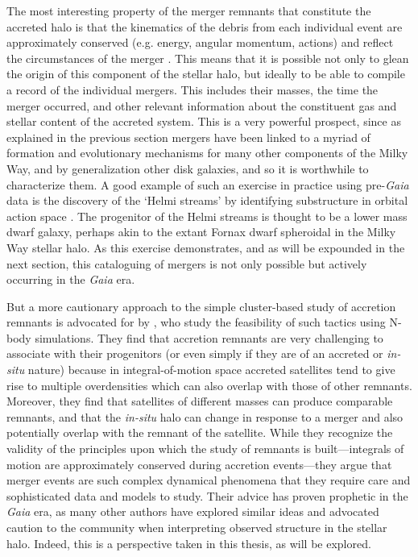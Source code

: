 The most interesting property of the merger remnants that constitute the accreted halo is that the kinematics of the debris from each individual event are approximately conserved (e.g. energy, angular momentum, actions) and reflect the circumstances of the merger \parencite{helmi00,johnston08}. This means that it is possible not only to glean the origin of this component of the stellar halo, but ideally to be able to compile a record of the individual mergers. This includes their masses, the time the merger occurred, and other relevant information about the constituent gas and stellar content of the accreted system. This is a very powerful prospect, since as explained in the previous section mergers have been linked to a myriad of formation and evolutionary mechanisms for many other components of the Milky Way, and by generalization other disk galaxies, and so it is worthwhile to characterize them. A good example of such an exercise in practice using pre-\textit{Gaia} data is the discovery of the `Helmi streams' by identifying substructure in orbital action space \parencite{helmi99}. The progenitor of the Helmi streams is thought to be a lower mass dwarf galaxy, perhaps akin to the extant Fornax dwarf spheroidal in the Milky Way stellar halo. As this exercise demonstrates, and as will be expounded in the next section, this cataloguing of mergers is not only possible but actively occurring in the \textit{Gaia} era.

But a more cautionary approach to the simple cluster-based study of accretion remnants is advocated for by \textcite{jean-baptiste17}, who study the feasibility of such tactics using N-body simulations. They find that accretion remnants are very challenging to associate with their progenitors (or even simply if they are of an accreted or \textit{in-situ} nature) because in integral-of-motion space accreted satellites tend to give rise to multiple overdensities which can also overlap with those of other remnants. Moreover, they find that satellites of different masses can produce comparable remnants, and that the \textit{in-situ} halo can change in response to a merger and also potentially overlap with the remnant of the satellite. While they recognize the validity of the principles upon which the study of remnants is built---integrals of motion are approximately conserved during accretion events---they argue that merger events are such complex dynamical phenomena that they require care and sophisticated data and models to study. Their advice has proven prophetic in the \textit{Gaia} era, as many other authors have explored similar ideas \parencite[][]{rey23,pagnini23} and advocated caution to the community when interpreting observed structure in the stellar halo. Indeed, this is a perspective taken in this thesis, as will be explored.

